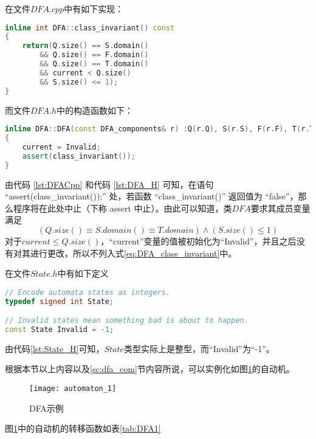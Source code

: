 在文件$DFA.cpp$中有如下实现：
\lstset{style=mystyle}
\begin{lstlisting}[language=C++,label={lst:DFACpp},caption={DFA.cpp}]
inline int DFA::class_invariant() const
{
	return(Q.size() == S.domain()
		&& Q.size() == F.domain()
		&& Q.size() == T.domain()
		&& current < Q.size()
		&& S.size() <= 1);
}
\end{lstlisting}
而文件$DFA.h$中的构造函数如下：
\lstset{style=mystyle}
\begin{lstlisting}[language=C++,label={lst:DFA_H},caption={DFA.h}]
inline DFA::DFA(const DFA_components& r) :Q(r.Q), S(r.S), F(r.F), T(r.T)
{
	current = Invalid;
	assert(class_invariant());
}
\end{lstlisting}
由代码 \ref{lst:DFACpp} 和代码 \ref{lst:DFA_H} 可知，在语句 “assert(class\_invariant());” 处，若函数 “class\_invariant()” 返回值为 “false”，那么程序将在此处中止\cite{assert_abort}（下称 assert 中止）。由此可以知道，类$DFA$要求其成员变量满足
\begin{equation}\label{eq:DFA_class_invariant}
    (Q.size() \equiv S.domain() \equiv T.domain ) \land (S.size() \leq 1)
\end{equation}
对于$current \le Q.size() $，“current”变量的值被初始化为“Invalid”，并且之后没有对其进行更改，所以不列入式\ref{eq:DFA_class_invariant}中。

在文件$State.h$中有如下定义
\lstset{style=mystyle}
\begin{lstlisting}[language=C++,label={lst:State_H},caption={State.h}]
// Encode automata states as integers.
typedef signed int State;

// Invalid states mean something bad is about to happen.
const State Invalid = -1;
\end{lstlisting}
由代码\ref{lst:State_H}可知，$State$类型实际上是整型，而“Invalid”为“-1”。

根据本节以上内容以及\ref{sc:dfa_com}节内容所说，可以实例化如图\ref{fig:DFA1}的自动机。

\begin{figure}[!htbp]
    \centering
    \texttt{[image: automaton\_1]}
    \caption{DFA示例}
    \label{fig:DFA1}
\end{figure}

\newpage
图\ref{fig:DFA1}中的自动机的转移函数如表\ref{tab:DFA1}

